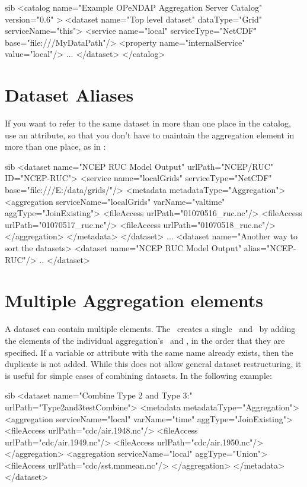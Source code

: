 \documentclass{dods-book}
\begin{document}
\begin{vcode}{sib}
<catalog name="Example OPeNDAP Aggregation Server Catalog" version="0.6" >
  <dataset name="Top level dataset" dataType="Grid" serviceName="this">
    <service name="local" serviceType="NetCDF" base="file:///MyDataPath"/>
    <property name="internalService" value="local"/>
    ...
  </dataset>
</catalog>
\end{vcode}

\section{Dataset Aliases}

If you want to refer to the same dataset in more than one place in the
catalog, use an  attribute, so that you don't have to
maintain the aggregation element in more than one place, as in
: 

\begin{vcode}{sib}
<dataset name="NCEP RUC Model Output" urlPath="NCEP/RUC" ID="NCEP-RUC">
  <service name="localGrids" serviceType="NetCDF" 
    base="file:///E:/data/grids/"/>
  <metadata metadataType="Aggregation">
    <aggregation serviceName="localGrids" varName="valtime" 
        aggType="JoinExisting">
      <fileAccess urlPath="01070516_ruc.nc"/>
      <fileAccess urlPath="01070517_ruc.nc"/>
      <fileAccess urlPath="01070518_ruc.nc"/>
    </aggregation>
  </metadata>
</dataset>      
...
<dataset name="Another way to sort the datasets>
  <dataset name="NCEP RUC Model Output" alias="NCEP-RUC"/>      
  ..
</dataset>
\end{vcode}

\section{Multiple Aggregation elements}

A dataset can contain multiple  elements. The \aggser\ 
creates a single \dds\ and \das\ by adding the elements of the individual
aggregation's \dds\ and \das , in the order that they are specified. If a
variable or attribute with the same name already exists, then the
duplicate is not added. While this does not allow general dataset
restructuring, it is useful for simple cases of combining datasets.
In the following example:

\begin{vcode}{sib}
<dataset name="Combine Type 2 and Type 3:" urlPath="Type2and3testCombine">
<metadata metadataType="Aggregation">
<aggregation serviceName="local" varName="time" aggType="JoinExisting">
<fileAccess urlPath="cdc/air.1948.nc"/>
<fileAccess urlPath="cdc/air.1949.nc"/>
<fileAccess urlPath="cdc/air.1950.nc"/>
</aggregation>
<aggregation serviceName="local" aggType="Union">
<fileAccess urlPath="cdc/sst.mnmean.nc"/>
</aggregation>
</metadata>
</dataset>
\end{vcode}
\end{document}

